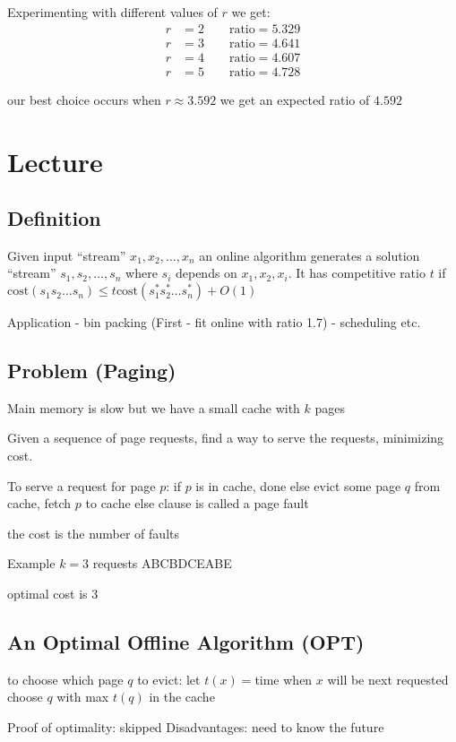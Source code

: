\documentclass[english,12pt]{article}
\theoremstyle{plain}
\theoremstyle{definition}
\theoremstyle{definition} %
\begin{document}
Experimenting with different values of $r$ we get:
\begin{align*}
r&=2 \qquad \text{ratio}=5.329\\
r&=3 \qquad \text{ratio}=4.641\\
r&=4 \qquad \text{ratio}=4.607\\
r&=5 \qquad \text{ratio}=4.728
\end{align*}

our best choice occurs when $r\approx 3.592$ we get an expected ratio of $4.592$

\section{Lecture}
\subsection{Definition}
Given input ``stream'' $x_1,x_2,\ldots, x_n$ an online algorithm generates a solution ``stream'' $s_1,s_2,\ldots, s_n$ where $s_i$ depends on $x_1, x_2, x_i$.  It has competitive ratio $t$ if $\text{cost}(s_1s_2\ldots s_n)\le t\text{cost}(s_1^\ast s_2^\ast \ldots s_n^\ast) +O(1)$

Application - bin packing (First - fit online with ratio 1.7)
- scheduling etc.

\subsection{Problem (Paging)}
Main memory is slow but we have a small cache with $k$ pages

Given a sequence of page requests, find a way to serve the requests, minimizing cost.

To serve a request for page $p$:
if $p$ is in cache, done
else evict some page $q$ from cache, fetch $p$ to cache
else clause is called a page fault

the cost is the number of faults

Example
$k=3$ 
requests
ABCBDCEABE

optimal cost is 3

\subsection{An Optimal Offline Algorithm (OPT)}
to choose which page $q$ to evict:
let $t(x)=$time when $x$ will be next requested choose $q$ with max $t(q)$ in the cache

Proof of optimality: skipped
Disadvantages: need to know the future
\end{document}
